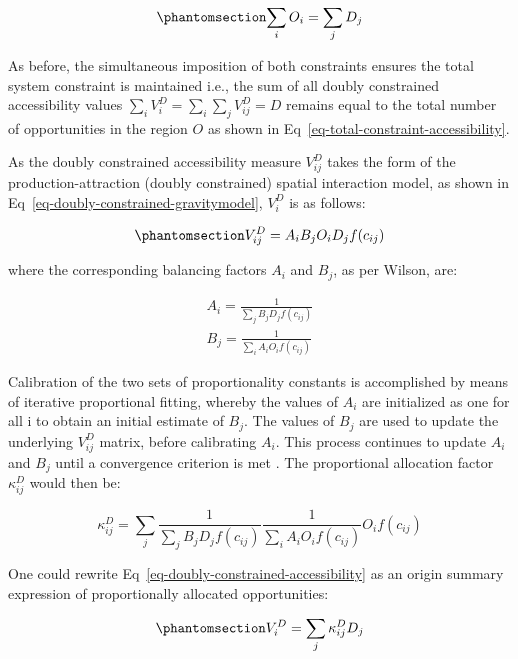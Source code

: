 \documentclass[
  10pt,
  letterpaper,
]{article}
\begin{document}
\begin{equation}\phantomsection\label{eq-opportunity-population-equality}{
\sum_i O_i = \sum_j D_j
}\end{equation}

As before, the simultaneous imposition of both constraints ensures the
total system constraint is maintained i.e., the sum of all doubly
constrained accessibility values
\(\sum_i V^D_{i} = \sum_i\sum_j  V^D_{ij} = D\) remains equal to the
total number of opportunities in the region \(O\) as shown in
Eq~\ref{eq-total-constraint-accessibility}.

As the doubly constrained accessibility measure \(V_{ij}^D\) takes the
form of the production-attraction (doubly constrained) spatial
interaction model, as shown in
Eq~\ref{eq-doubly-constrained-gravitymodel}, \(V_{i}^D\) is as follows:

\begin{equation}\phantomsection\label{eq-doubly-constrained-accessibility}{
V_{ij}^D = A_i B_j O_i D_j f(c_{ij})
}\end{equation}

\noindent where the corresponding balancing factors \(A_i\) and \(B_j\),
as per Wilson, are:

\[
\begin{array}{l}
A_i = \frac{1}{\sum_j B_j D_j f(c_{ij})}\\
B_j = \frac{1}{\sum_i A_i O_i f(c_{ij})}
\end{array}
\]

Calibration of the two sets of proportionality constants is accomplished
by means of iterative proportional fitting, whereby the values of
\(A_i\) are initialized as one for all i to obtain an initial estimate
of \(B_j\). The values of \(B_j\) are used to update the underlying
\(V_{ij}^D\) matrix, before calibrating \(A_i\). This process continues
to update \(A_i\) and \(B_j\) until a convergence criterion is met
\citep[see][p.~193-195]{ortuzar_2011_modelling}. The proportional
allocation factor \(\kappa_{ij}^D\) would then be:

\[
\kappa_{ij}^D = \sum_j \frac{1}{\sum_j B_j D_j f(c_{ij})} \frac{1}{\sum_i A_i O_i f(c_{ij})} O_i f(c_{ij})
\]

One could rewrite Eq~\ref{eq-doubly-constrained-accessibility} as an
origin summary expression of proportionally allocated opportunities:

\begin{equation}\phantomsection\label{eq-doubly-constrained-accessibility-w-paf}{
V^D_{i} = \sum_j \kappa^D_{ij} D_j
}\end{equation}
\end{document}
